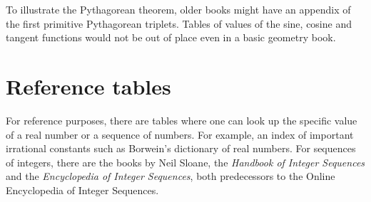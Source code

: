 \documentclass[12pt]{article}
\begin{document}
To illustrate the Pythagorean theorem, older books might have an appendix of the first primitive Pythagorean triplets. Tables of values of the sine, cosine and tangent functions would not be out of place even in a basic geometry book.

\section{Reference tables}

For reference purposes, there are tables where one can look up the specific value of a real number or a sequence of numbers. For example, an index of important irrational constants such as Borwein's dictionary of real numbers. For sequences of integers, there are the books by Neil Sloane, the {\it Handbook of Integer Sequences} and the {\it Encyclopedia of Integer Sequences}, both predecessors to the Online Encyclopedia of Integer Sequences.
\end{document}
